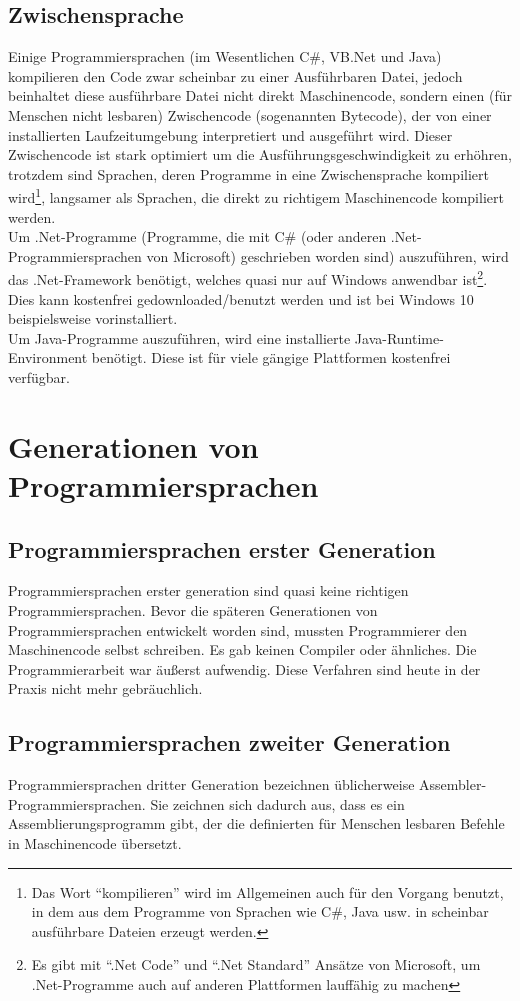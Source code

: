 \begin{multicols}{3}
\subsection{Zwischensprache}
Einige Programmiersprachen (im Wesentlichen C\#, VB.Net und Java) kompilieren den Code zwar scheinbar zu einer Ausführbaren Datei, jedoch beinhaltet diese ausführbare Datei nicht direkt Maschinencode, sondern einen (für Menschen nicht lesbaren) Zwischencode (sogenannten Bytecode), der von einer installierten Laufzeitumgebung interpretiert und ausgeführt wird. Dieser Zwischencode ist stark optimiert um die Ausführungsgeschwindigkeit zu erhöhren, trotzdem sind Sprachen, deren Programme in eine Zwischensprache kompiliert wird\footnote{Das Wort \enquote{kompilieren} wird im Allgemeinen auch für den Vorgang benutzt, in dem aus dem Programme von Sprachen wie C\#, Java usw. in scheinbar ausführbare Dateien erzeugt werden.}, langsamer als Sprachen, die direkt zu richtigem Maschinencode kompiliert werden.\\
Um .Net-Programme (Programme, die mit C\# (oder anderen .Net-Programmiersprachen von Microsoft) geschrieben worden sind) auszuführen, wird das .Net-Framework benötigt, welches quasi nur auf Windows anwendbar ist\footnote{Es gibt mit \enquote{.Net Code} und \enquote{.Net Standard} Ansätze von Microsoft, um .Net-Programme auch auf anderen Plattformen lauffähig zu machen}. Dies kann kostenfrei gedownloaded/benutzt werden und ist bei Windows 10 beispielsweise vorinstalliert.\\
Um Java-Programme auszuführen, wird eine installierte Java-Runtime-Environment benötigt. Diese ist für viele gängige Plattformen kostenfrei verfügbar.

\section{Generationen von Programmiersprachen}
\subsection{Programmiersprachen erster Generation}
Programmiersprachen erster generation sind quasi keine richtigen Programmiersprachen. Bevor die späteren Generationen von Programmiersprachen entwickelt worden sind, mussten Programmierer den Maschinencode selbst schreiben. Es gab keinen Compiler oder ähnliches. Die Programmierarbeit war äußerst aufwendig. Diese Verfahren sind heute in der Praxis nicht mehr gebräuchlich.
\subsection{Programmiersprachen zweiter Generation}
Programmiersprachen dritter Generation bezeichnen üblicherweise Assembler-Programmiersprachen. Sie zeichnen sich dadurch aus, dass es ein Assemblierungsprogramm gibt, der die definierten für Menschen lesbaren Befehle in Maschinencode übersetzt.

\end{multicols}
